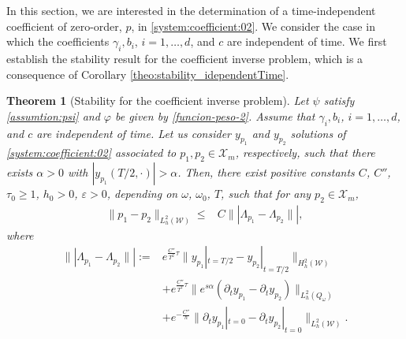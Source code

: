 \documentclass{amsart}
\numberwithin{equation}{section}
\newtheorem{theorem}{Theorem}[section]
\begin{document}
In this section, we are interested in the determination of a time-independent coefficient of zero-order, $p$, in \eqref{system:coefficient:02}. We consider the case in which the coefficients $\gamma_i, b_i$, $i=1,\ldots,d$, and $c$ are independent of time. We first establish the stability result for the coefficient inverse problem, which is a consequence of Corollary \ref{theo:stability_idependentTime}.
 \begin{theorem}[Stability for the coefficient inverse problem]\label{theorem:convergence}
 Let $\psi$ satisfy \eqref{assumtion:psi} and $\varphi$ be given by \eqref{funcion-peso-2}. Assume that $\gamma_i, b_i$, $i=1,\ldots,d$, and $c$ are independent of time. Let us consider $y_{p_1}$ and $y_{p_2}$ solutions of \eqref{system:coefficient:02} associated to $p_1,p_2\in \mathcal{X}_{m}$, respectively, such that there exists $\alpha>0$ with $|y_{p_1}(T/2,\cdot)|>\alpha$. Then, there exist positive constants $C$, $C''$,  $\tau_{0}\geq 1$, $h_{0}>0$, $\varepsilon >0$, depending on $\omega$, $\omega_{0}$, $T$, such that for any $p_2\in \mathcal{X}_{m}$,
\begin{equation}\label{stability:03}
    \begin{aligned}
		\|p_1-p_2\|_{L_h^2(\mathcal{W})}\leq &C
        \||\Lambda_{p_1}-\Lambda_{p_2}\||,
    \end{aligned}
\end{equation} 
where 
        $$
        \begin{aligned}
            \||\Lambda_{p_1}-\Lambda_{p_2}\||:= &
            e^{\frac{C''}{T^2}\tau}\|y_{p_1}|_{t=T/2}-y_{p_2}|_{t=T/2}\|_{H_h^2(\mathcal{W})}\\
            &+e^{\frac{C''}{T^2}\tau}\|e^{s\alpha}(\partial_{t}y_{p_1}-\partial_{t}y_{p_2})\|_{L_h^2(Q_\omega)}\\
            &+e^{-\frac{C''}{h}}\|\partial_{t}y_{p_1}|_{t=0}-\partial_{t}y_{p_2}|_{t=0}\|_{L^2_h(\mathcal{W})}.
        \end{aligned}$$
 \end{theorem}
\end{document}
